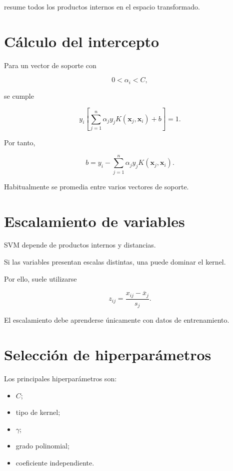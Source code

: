 \documentclass[
  spanish,
  10.5pt,
  letterpaper,
  DIV=11,
  numbers=noendperiod,
  oneside,
  open=any]{scrreprt}
\providecommand{\tightlist}{%
  \setlength{\itemsep}{0pt}\setlength{\parskip}{0pt}}
\theoremstyle{definition}
\theoremstyle{definition}
\theoremstyle{plain}
\theoremstyle{remark}
\begin{document}
resume todos los productos internos en el espacio transformado.

\section*{Cálculo del intercepto}\label{cuxe1lculo-del-intercepto}


Para un vector de soporte con

\[
0<\alpha_i<C,
\]

se cumple

\[
y_i
\left[
\sum_{j=1}^{n}
\alpha_j y_j
K(\mathbf{x}_j,\mathbf{x}_i)
+b
\right]
=
1.
\]

Por tanto,

\[
b
=
y_i
-
\sum_{j=1}^{n}
\alpha_j y_j
K(\mathbf{x}_j,\mathbf{x}_i).
\]

Habitualmente se promedia entre varios vectores de soporte.

\section*{Escalamiento de variables}\label{escalamiento-de-variables}


SVM depende de productos internos y distancias.

Si las variables presentan escalas distintas, una puede dominar el
kernel.

Por ello, suele utilizarse

\[
z_{ij}
=
\frac{
x_{ij}-\overline{x}_j
}{
s_j
}.
\]

El escalamiento debe aprenderse únicamente con datos de entrenamiento.

\section*{Selección de
hiperparámetros}\label{selecciuxf3n-de-hiperparuxe1metros-2}


Los principales hiperparámetros son:

\begin{itemize}
\tightlist
\item
  \(C\);
\item
  tipo de kernel;
\item
  \(\gamma\);
\item
  grado polinomial;
\item
  coeficiente independiente.
\end{itemize}
\end{document}
